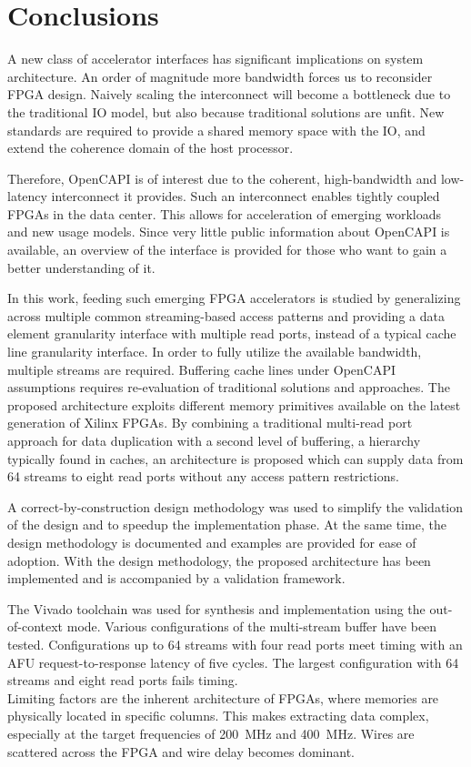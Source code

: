 \chapter{Conclusions}

A new class of accelerator interfaces has significant implications on system architecture. An order of magnitude more bandwidth forces us to reconsider FPGA design. Naively scaling the interconnect will become a bottleneck due to the traditional IO model, but also because traditional solutions are unfit. New standards are required to provide a shared memory space with the IO, and extend the coherence domain of the host processor.

Therefore, OpenCAPI is of interest due to the coherent, high-bandwidth and low-latency interconnect it provides. Such an interconnect enables tightly coupled FPGAs in the data center. This allows for acceleration of emerging workloads and new usage models. Since very little public information about OpenCAPI is available, an overview of the interface is provided for those who want to gain a better understanding of it.

In this work, feeding such emerging FPGA accelerators is studied by generalizing across multiple common streaming-based access patterns and providing a data element granularity interface with multiple read ports, instead of a typical cache line granularity interface.
In order to fully utilize the available bandwidth, multiple streams are required. Buffering cache lines under OpenCAPI assumptions requires re-evaluation of traditional solutions and approaches. The proposed architecture exploits different memory primitives available on the latest generation of Xilinx FPGAs. By combining a traditional multi-read port approach for data duplication with a second level of buffering, a hierarchy typically found in caches, an architecture is proposed which can supply data from 64 streams to eight read ports without any access pattern restrictions.

A correct-by-construction design methodology was used to simplify the validation of the design and to speedup the implementation phase. At the same time, the design methodology is documented and examples are provided for ease of adoption. With the design methodology, the proposed architecture has been implemented and is accompanied by a validation framework.

The Vivado toolchain was used for synthesis and implementation using the out-of-context mode. Various configurations of the multi-stream buffer have been tested. Configurations up to 64 streams with four read ports meet timing with an AFU request-to-response latency of five cycles. The largest configuration with 64 streams and eight read ports fails timing.\\
Limiting factors are the inherent architecture of FPGAs, where memories are physically located in specific columns. This makes extracting data complex, especially at the target frequencies of \SI{200}{\mega\hertz} and \SI{400}{\mega\hertz}. Wires are scattered across the FPGA and wire delay becomes dominant.

